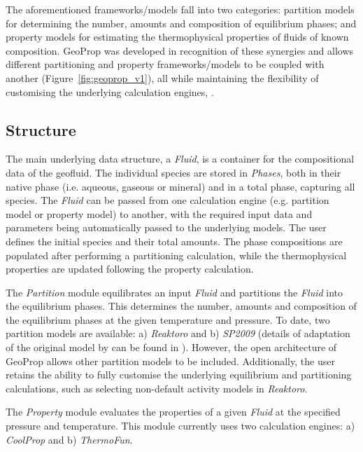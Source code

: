 The aforementioned frameworks/models fall into two categories: partition models for determining the number, amounts and composition of equilibrium phases; and property models for estimating the thermophysical properties of fluids of known composition. GeoProp was developed in recognition of these synergies and allows different partitioning and property frameworks/models to be coupled with another (Figure~\ref{fig:geoprop_v1}), all while maintaining the flexibility of customising the underlying calculation engines, \cite{Merbecks2024}.

\subsection{Structure}
\label{sec:geopropv1_structure}

    The main underlying data structure, a \emph{Fluid}, is a container for the compositional data of the geofluid. The individual species are stored in \emph{Phases}, both in their native phase (i.e. aqueous, gaseous or mineral) and in a total phase, capturing all species. The \emph{Fluid} can be passed from one calculation engine (e.g. partition model or property model) to another, with the required input data and parameters being automatically passed to the underlying models. The user defines the initial species and their total amounts. The phase compositions are populated after performing a partitioning calculation, while the thermophysical properties are updated following the property calculation.

    The \emph{Partition} module equilibrates an input \emph{Fluid} and partitions the \emph{Fluid} into the equilibrium phases. This determines the number, amounts and composition of the equilibrium phases at the given temperature and pressure. To date, two partition models are available: a) \emph{Reaktoro} and b) \emph{\ac{SP2009}} (details of adaptation of the original model by \citeauthor{Spycher2009} can be found in ). However, the open architecture of GeoProp allows other partition models to be included. Additionally, the user retains the ability to fully customise the underlying equilibrium and partitioning calculations, such as selecting non-default activity models in \emph{Reaktoro}.

    The \emph{Property} module evaluates the properties of a given \emph{Fluid} at the specified pressure and temperature. This module currently uses two calculation engines: a) \emph{CoolProp} and b) \emph{ThermoFun}.

